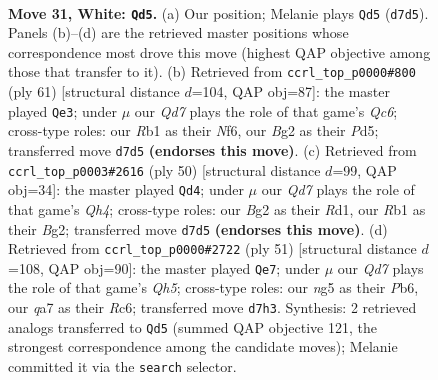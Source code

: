\documentclass[11pt]{article}
\begin{document}
\clearpage

\begin{figure}[p]\centering
\begin{subfigure}{0.46\textwidth}\centering
\resizebox{\linewidth}{!}{%
\newchessgame
\chessboard[
  setfen={r2n1k2/qp1Q1pp1/p7/6np/7N/4P1P1/PP2RPBP/1R4K1 w - - 1 31},
  showmover=false,
  pgfstyle=straightmove, color=movearrow, markmove={d7-d5}
]}
\caption{}
\end{subfigure}\hfill
\begin{subfigure}{0.46\textwidth}\centering
\resizebox{\linewidth}{!}{%
\newchessgame
\chessboard[
  setfen={6k1/1p2r1pp/p4n2/3p4/3N4/1Pq2PQ1/2P3PP/3R1K2 b - - 4 31},
  showmover=false,
  pgfstyle=straightmove, color=movearrow, markmove={c3-e3}
]}
\caption{}
\end{subfigure}
\\[4pt]
\begin{subfigure}{0.46\textwidth}\centering
\resizebox{\linewidth}{!}{%
\newchessgame
\chessboard[
  setfen={4r1k1/5p1p/3q1np1/r2p4/7Q/p3P1PP/P4PB1/R2R2K1 w - - 0 26},
  showmover=false,
  pgfstyle=straightmove, color=movearrow, markmove={h4-d4}
]}
\caption{}
\end{subfigure}\hfill
\begin{subfigure}{0.46\textwidth}\centering
\resizebox{\linewidth}{!}{%
\newchessgame
\chessboard[
  setfen={4r1k1/p4p2/1pr3pp/2p1n3/4N2q/P1Q1PP2/1P4PP/1K1R3R b - - 1 26},
  showmover=false,
  pgfstyle=straightmove, color=movearrow, markmove={h4-e7}
]}
\caption{}
\end{subfigure}
\caption{\textbf{Move 31, White: \texttt{Qd5}.} (a) Our position; Melanie plays \texttt{Qd5} (\texttt{d7d5}). Panels (b)--(d) are the retrieved master positions whose correspondence most drove this move (highest QAP objective among those that transfer to it). (b) Retrieved from \texttt{ccrl\_top\_p0000\#800} (ply 61) [structural distance $d$=104, QAP obj=87]: the master played \texttt{Qe3}; under $\mu$ our \emph{Qd7} plays the role of that game's \emph{Qc6}; cross-type roles: our \emph{R}b1 as their \emph{N}f6, our \emph{B}g2 as their \emph{P}d5; transferred move \texttt{d7d5} \textbf{(endorses this move)}. (c) Retrieved from \texttt{ccrl\_top\_p0003\#2616} (ply 50) [structural distance $d$=99, QAP obj=34]: the master played \texttt{Qd4}; under $\mu$ our \emph{Qd7} plays the role of that game's \emph{Qh4}; cross-type roles: our \emph{B}g2 as their \emph{R}d1, our \emph{R}b1 as their \emph{B}g2; transferred move \texttt{d7d5} \textbf{(endorses this move)}. (d) Retrieved from \texttt{ccrl\_top\_p0000\#2722} (ply 51) [structural distance $d$=108, QAP obj=90]: the master played \texttt{Qe7}; under $\mu$ our \emph{Qd7} plays the role of that game's \emph{Qh5}; cross-type roles: our \emph{n}g5 as their \emph{P}b6, our \emph{q}a7 as their \emph{R}c6; transferred move \texttt{d7h3}. Synthesis: 2 retrieved analogs transferred to \texttt{Qd5} (summed QAP objective 121, the strongest correspondence among the candidate moves); Melanie committed it via the \texttt{search} selector.}
\label{fig:thought-m60}
\end{figure}
\end{document}
